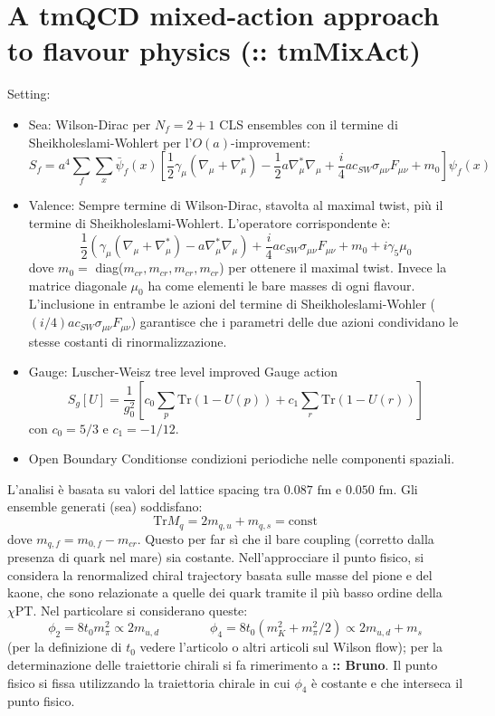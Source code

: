 \documentclass[12pt,a4paper,openright]{article}
\newcommand{\colg}{\textcolor{PineGreen}}
\newcommand{\cpt}{$\chi\text{PT}$}
\newcommand{\fm}{\text{ fm}}
\newcommand{\obc}{Open Boundary Conditions}
\newcommand{\tr}{\text{Tr}}
\begin{document}
\section{A tmQCD mixed-action approach to flavour physics (:: tmMixAct)}
Setting:
\begin{itemize}
  \item Sea: Wilson-Dirac per $N_f = 2+1$ CLS ensembles con il termine di Sheikholeslami-Wohlert per l'$O(a)$-improvement: $$S_f = a^4 \sum_f \sum_x \bar\psi_f (x) \left[ \frac{1}{2}\gamma_\mu(\nabla_\mu+\nabla_\mu^*) -\frac{1}{2}a\nabla_\mu^*\nabla_\mu + \frac{i}{4}ac_{SW} \sigma_{\mu\nu}F_{\mu\nu} + m_0 \right] \psi_f (x)$$  
  \item Valence: Sempre termine di Wilson-Dirac, stavolta al maximal twist, più il termine di Sheikholeslami-Wohlert. L'operatore corrispondente è: $$\frac{1}{2}\left(\gamma_\mu(\nabla_\mu+\nabla_\mu^*) -a\nabla_\mu^*\nabla_\mu \right)+ \frac{i}{4}ac_{SW} \sigma_{\mu\nu}F_{\mu\nu} + m_0 + i\gamma_5 \mu_0$$ dove $m_0 = $ diag($m_{cr},m_{cr},m_{cr},m_{cr}$) per ottenere il maximal twist. Invece la matrice diagonale $\mu_0$ ha come elementi le bare masses di ogni flavour.
        \colg{L'inclusione in entrambe le azioni del termine di Sheikholeslami-Wohler ($({i}/{4})ac_{SW} \sigma_{\mu\nu}F_{\mu\nu}$) garantisce che i parametri delle due azioni condividano le stesse costanti di rinormalizzazione}.
  \item Gauge: Luscher-Weisz tree level improved Gauge action $$S_g[U] = \frac{1}{g_0^2} \left[c_0 \sum_p \tr \left(1-U(p)\right) + c_1 \sum_r \tr \left(1-U(r)\right)\right]$$ con $c_0 = 5/3$ e $c_1 = -1/12$.
  \item \obc e condizioni periodiche nelle componenti spaziali.
\end{itemize}
L'analisi è basata su valori del lattice spacing tra $0.087\fm$ e $0.050\fm$.
Gli ensemble generati (sea) soddisfano:
\begin{equation}\label{eq:traceCLSmasses}
  \tr M_q = 2m_{q,u} + m_{q,s} = \text{const}
\end{equation}
dove $m_{q,f} = m_{0,f} - m_{cr}$.
Questo per far sì che il bare coupling (corretto dalla presenza di quark nel mare) sia costante.
Nell'approcciare il punto fisico, si considera la \colg{renormalized chiral trajectory} basata sulle masse del pione e del kaone, che sono relazionate a quelle dei quark tramite il più basso ordine della \cpt.
Nel particolare si considerano queste:
\begin{equation}\label{eq:phi2,4}
  \phi_2 = 8t_0 m_\pi^2 \propto 2m_{u,d} \qquad \qquad \phi_4 = 8t_0 \left( m_K^2 + m_\pi^2/2 \right) \propto 2m_{u,d} + m_s
\end{equation}
(per la definizione di $t_0$ vedere l'articolo o altri articoli sul Wilson flow);
per la determinazione delle traiettorie chirali si fa rimerimento a {\bf :: Bruno}.
Il punto fisico si fissa utilizzando la traiettoria chirale in cui $\phi_4$ è costante e che interseca il punto fisico.
\end{document}
